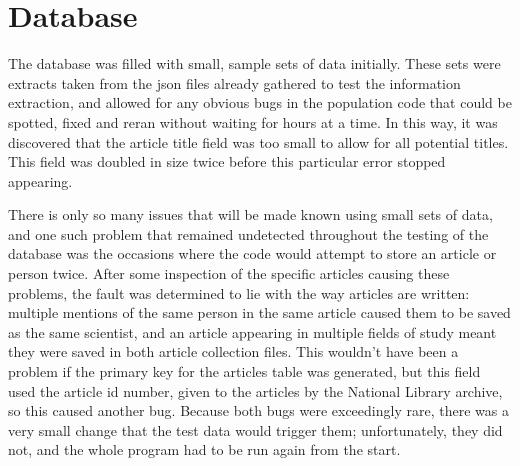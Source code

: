 \documentclass[11pt,a4paper]{article}
\begin{document}
\section{Database}
The database was filled with small, sample sets of data initially. These sets were extracts taken from the json files already gathered to test the information extraction, and allowed for any obvious bugs in the population code that could be spotted, fixed and reran without waiting for hours at a time. In this way, it was discovered that the article title field was too small to allow for all potential titles. This field was doubled in size twice before this particular error stopped appearing. 

There is only so many issues that will be made known using small sets of data, and one such problem that remained undetected throughout the testing of the database was the occasions where the code would attempt to store an article or person twice. After some inspection of the specific articles causing these problems, the fault was determined to lie with the way articles are written: multiple mentions of the same person in the same article caused them to be saved as the same scientist, and an article appearing in multiple fields of study meant they were saved in both article collection files. This wouldn't have been a problem if the primary key for the articles table was generated, but this field used the article id number, given to the articles by the National Library archive, so this caused another bug. Because both bugs were exceedingly rare, there was a very small change that the test data would trigger them; unfortunately, they did not, and the whole program had to be run again from the start. 
\end{document}
